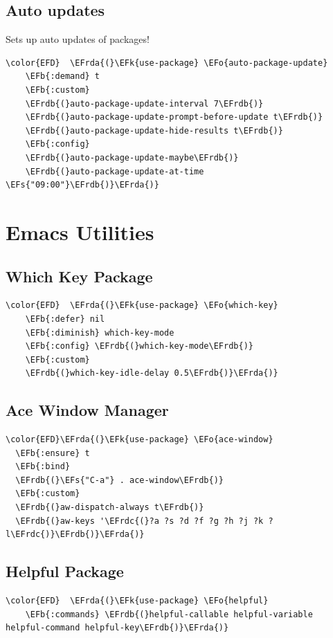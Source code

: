 \documentclass[11pt]{article}
\newcommand{\EFs}[1]{\textcolor{EFs}{#1}} %
\newcommand{\EFk}[1]{\textcolor{EFk}{#1}} %
\newcommand{\EFb}[1]{\textcolor{EFb}{#1}} %
\newcommand{\EFo}[1]{\textcolor{EFo}{#1}} %
\newcommand{\EFrda}[1]{\textcolor{EFrda}{#1}} %
\newcommand{\EFrdb}[1]{\textcolor{EFrdb}{#1}} %
\newcommand{\EFrdc}[1]{\textcolor{EFrdc}{#1}} %
\begin{document}
\subsection{Auto updates}
\label{sec:org1484dad}
Sets up auto updates of packages!

\begin{Code}
\begin{Verbatim}
\color{EFD}  \EFrda{(}\EFk{use-package} \EFo{auto-package-update}
    \EFb{:demand} t
    \EFb{:custom}
    \EFrdb{(}auto-package-update-interval 7\EFrdb{)}
    \EFrdb{(}auto-package-update-prompt-before-update t\EFrdb{)}
    \EFrdb{(}auto-package-update-hide-results t\EFrdb{)}
    \EFb{:config}
    \EFrdb{(}auto-package-update-maybe\EFrdb{)}
    \EFrdb{(}auto-package-update-at-time \EFs{"09:00"}\EFrdb{)}\EFrda{)}
\end{Verbatim}
\end{Code}

\section{Emacs Utilities}
\label{sec:org63bdab7}
\subsection{Which Key Package}
\label{sec:org1f4d2c7}
\begin{Code}
\begin{Verbatim}
\color{EFD}  \EFrda{(}\EFk{use-package} \EFo{which-key}
    \EFb{:defer} nil
    \EFb{:diminish} which-key-mode
    \EFb{:config} \EFrdb{(}which-key-mode\EFrdb{)}
    \EFb{:custom}
    \EFrdb{(}which-key-idle-delay 0.5\EFrdb{)}\EFrda{)}
\end{Verbatim}
\end{Code}
\subsection{Ace Window Manager}
\label{sec:org0c693f9}
\begin{Code}
\begin{Verbatim}
\color{EFD}\EFrda{(}\EFk{use-package} \EFo{ace-window}
  \EFb{:ensure} t
  \EFb{:bind}
  \EFrdb{(}\EFs{"C-a"} . ace-window\EFrdb{)}
  \EFb{:custom}
  \EFrdb{(}aw-dispatch-always t\EFrdb{)}
  \EFrdb{(}aw-keys '\EFrdc{(}?a ?s ?d ?f ?g ?h ?j ?k ?l\EFrdc{)}\EFrdb{)}\EFrda{)}
\end{Verbatim}
\end{Code}
\subsection{Helpful Package}
\label{sec:org68922fc}
\begin{Code}
\begin{Verbatim}
\color{EFD}  \EFrda{(}\EFk{use-package} \EFo{helpful}
    \EFb{:commands} \EFrdb{(}helpful-callable helpful-variable helpful-command helpful-key\EFrdb{)}\EFrda{)}
\end{Verbatim}
\end{Code}
\end{document}
